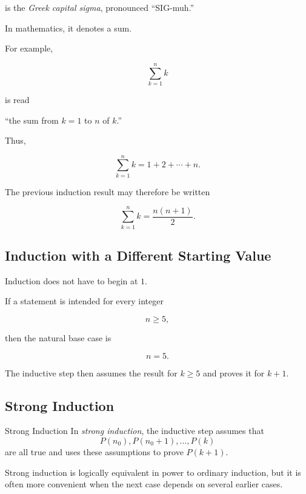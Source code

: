 is the \emph{Greek capital sigma}, pronounced ``SIG-muh.''

In mathematics, it denotes a sum.

For example,

\[ \sum_{k=1}^{n}k \]

is read

\begin{center}
``the sum from \(k=1\) to \(n\) of \(k\).''
\end{center}

Thus,

\[ \sum_{k=1}^{n}k=1+2+\cdots+n. \]

The previous induction result may therefore be written

\[ \sum_{k=1}^{n}k=\frac{n(n+1)}2. \]

\subsection{Induction with a Different Starting Value}
\label{subsec:induction-starting-index}

Induction does not have to begin at \(1\).

If a statement is intended for every integer

\[ n\geq5, \]

then the natural base case is

\[ n=5. \]

The inductive step then assumes the result for \(k\geq5\) and proves it for
\(k+1\).

\subsection{Strong Induction}
\label{subsec:strong-induction}

\begin{definitionbox}{Strong Induction}
In \emph{strong induction}, the inductive step assumes that
\[ P(n_0),P(n_0+1),\ldots,P(k) \]
are all true and uses these assumptions to prove \(P(k+1)\).
\end{definitionbox}

Strong induction is logically equivalent in power to ordinary induction, but
it is often more convenient when the next case depends on several earlier
cases.

